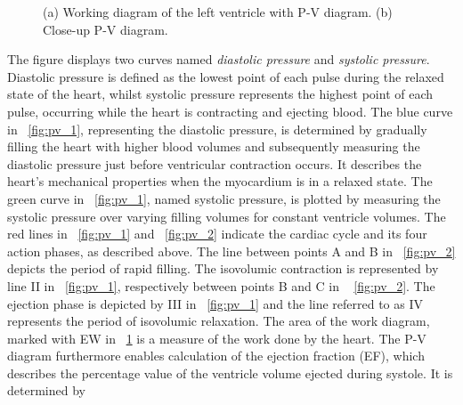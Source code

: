 \begin{figure}[ht!]
  \centering
  \caption[P-V diagram \cite{GH20}]{(a) Working diagram of the left ventricle with P-V diagram. (b) Close-up P-V diagram. \cite{GH20}}
  \label{fig:pv}
\end{figure}
The figure displays two curves named \textit{diastolic pressure} and \textit{systolic pressure}. Diastolic pressure is defined as the lowest point of each pulse during the relaxed state of the heart, whilst systolic pressure represents the highest point of each pulse, occurring while the heart is contracting and ejecting blood. \cite{HKS4}
The blue curve in \figurename~\ref{fig:pv_1}, representing the diastolic pressure, is determined by gradually filling the heart with higher blood volumes and subsequently measuring the diastolic pressure just before ventricular contraction occurs. It describes the heart's mechanical properties when the myocardium is in a relaxed state. The green curve in \figurename~\ref{fig:pv_1}, named systolic pressure, is plotted by measuring the systolic pressure over varying filling volumes for constant ventricle volumes. The red lines in \figurename~\ref{fig:pv_1} and \figurename~\ref{fig:pv_2} indicate the cardiac cycle and its four action phases, as described above. The line between points A and B in \figurename~\ref{fig:pv_2} depicts the period of rapid filling. The isovolumic contraction is represented by line II in \figurename~\ref{fig:pv_1}, respectively between points B and C in \figurename~ \ref{fig:pv_2}. The ejection phase is depicted by III in \figurename~\ref{fig:pv_1} and the line referred to as IV represents the period of isovolumic relaxation. The area of the work diagram, marked with EW in \figurename~\ref{fig:pv} is a measure of the work done by the heart. The P-V diagram furthermore enables calculation of the ejection fraction (EF), which describes the percentage value of the ventricle volume ejected during systole. It is determined by
